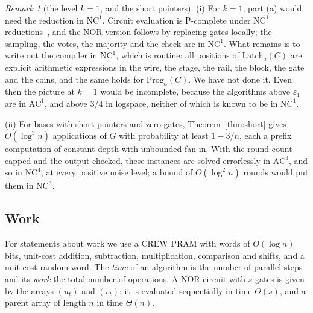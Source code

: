 \documentclass[11pt]{amsart}
\theoremstyle{definition}
\theoremstyle{remark}
\newtheorem{remark}[theorem]{Remark}
\newcommand{\eps}{\varepsilon}
\begin{document}
\begin{remark}[the level $k=1$, and the short pointers]\label{rem:levels}
(i) For $k=1$, part (a) would need the reduction in $\mathrm{NC}^1$. Circuit evaluation is
P-complete under $\mathrm{NC}^1$ reductions~\cite{ghr}, and the NOR version follows by replacing
gates locally; the sampling, the votes, the majority and the check are in $\mathrm{NC}^1$. What
remains is to write out the compiler in $\mathrm{NC}^1$, which is routine: all positions of
$\mathrm{Latch}_a(C)$ are explicit arithmetic expressions in the wire, the stage, the rail, the
block, the gate and the coins, and the same holds for $\mathrm{Prog}_a(C)$. We have not done it. Even then the picture at $k=1$ would be
incomplete, because the algorithms above $\eps_1$ are in $\mathrm{AC}^1$, and above $3/4$ in logspace,
neither of which is known to be in $\mathrm{NC}^1$.

(ii) For bases with short pointers and zero gates, Theorem~\ref{thm:short} gives $O(\log^3n)$
applications of $G$ with probability at least $1-3/n$, each a prefix computation of constant depth
with unbounded fan-in. With the round count capped and the output checked, these instances are
solved errorlessly in $\mathrm{AC}^3$, and so in $\mathrm{NC}^4$, at every positive noise level;
a bound of $O(\log^2n)$ rounds would put them in $\mathrm{NC}^3$.
\end{remark}

\subsection{Work}

For statements about work we use a CREW PRAM with words of $O(\log n)$ bits, unit-cost addition,
subtraction, multiplication, comparison and shifts, and a unit-cost random word. The \emph{time}
of an algorithm is the number of parallel steps and its \emph{work} the total number of
operations. A NOR circuit with $s$ gates is given by the arrays $(u_t)$ and $(v_t)$; it is
evaluated sequentially in time $\Theta(s)$, and a parent array of length $n$ in time $\Theta(n)$.
\end{document}

